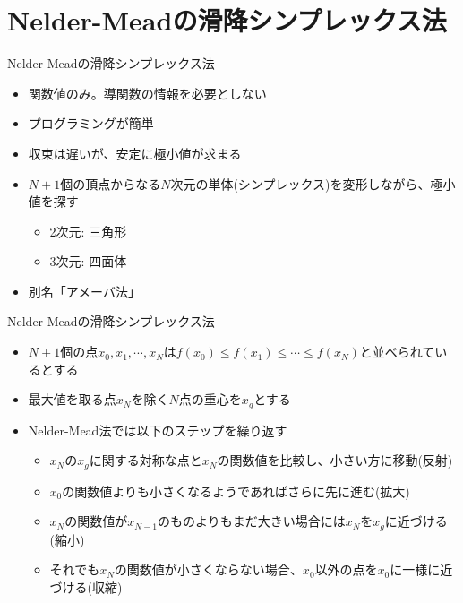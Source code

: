 \section{Nelder-Meadの滑降シンプレックス法}

\begin{frame}[t,fragile]{Nelder-Meadの滑降シンプレックス法}
  \begin{itemize}
    \setlength{\itemsep}{1em}
  \item 関数値のみ。導関数の情報を必要としない
  \item プログラミングが簡単
  \item 収束は遅いが、安定に極小値が求まる
  \item $N+1$個の頂点からなる$N$次元の単体(シンプレックス)を変形しながら、極小値を探す
    \begin{itemize}
    \item 2次元: 三角形
    \item 3次元: 四面体
    \end{itemize}
  \item 別名「アメーバ法」
  \end{itemize}
\end{frame}

\begin{frame}[t,fragile]{Nelder-Meadの滑降シンプレックス法}
  \begin{itemize}
    \setlength{\itemsep}{1em}
  \item $N+1$個の点$x_0,x_1,\cdots,x_N$は$f(x_0) \le f(x_1) \le \cdots \le f(x_N)$と並べられているとする
  \item 最大値を取る点$x_N$を除く$N$点の重心を$x_g$とする
  \item Nelder-Mead法では以下のステップを繰り返す
    \begin{itemize}
      \item $x_N$の$x_g$に関する対称な点と$x_N$の関数値を比較し、小さい方に移動(反射)
      \item $x_0$の関数値よりも小さくなるようであればさらに先に進む(拡大)
      \item $x_N$の関数値が$x_{N-1}$のものよりもまだ大きい場合には$x_N$を$x_g$に近づける(縮小)
      \item それでも$x_N$の関数値が小さくならない場合、$x_0$以外の点を$x_0$に一様に近づける(収縮)
    \end{itemize}
  \end{itemize}
\end{frame}

